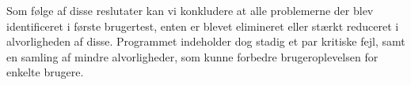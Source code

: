 Som følge af disse reslutater kan vi konkludere at alle problemerne der blev identificeret i første brugertest, enten er blevet elimineret eller stærkt reduceret i alvorligheden af disse. 
Programmet indeholder dog stadig et par kritiske fejl, samt en samling af mindre alvorligheder, som kunne forbedre brugeroplevelsen for enkelte brugere.